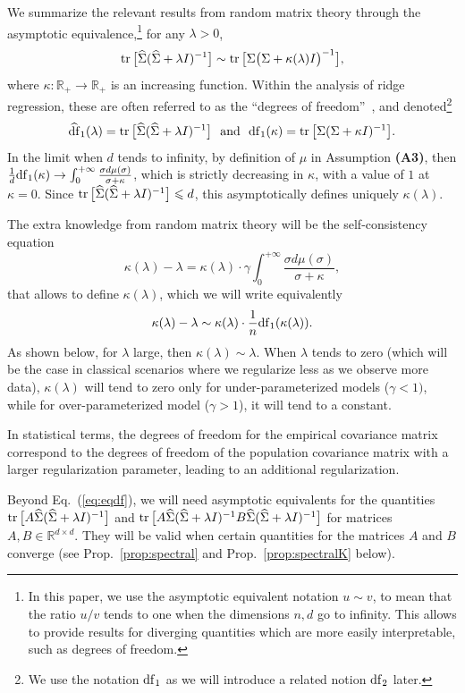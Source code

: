 \documentclass[11pt]{article}
\newcommand{\BEQ}{\begin{equation}}
\newcommand{\EEQ}{\end{equation}}
\newcommand{\tr}{\mathop{ \rm tr}}
\newcommand{\idm}{I}
\newcommand{\rb}{\mathbb{R}}
\newcommand{\eq}[1]{Eq.~(\ref{eq:#1})}
\def \hS{ \widehat{ \Sigma} }
\def \S{  { \Sigma} }
\begin{document}
We summarize the relevant results from random matrix theory through the asymptotic equivalence,\footnote{In this paper, we use the asymptotic equivalent notation $u \sim v$, to mean that the ratio $u/v$ tends to one when the dimensions $n,d$ go to infinity. This allows to provide results for diverging quantities which are more easily interpretable, such as degrees of freedom.} for any $\lambda > 0$,
\BEQ
\label{eq:eqdf} \tr \big[ \hS ( \hS+ \lambda \idm)^{-1}\big] \sim \tr \big[ \S \big( \S + \kappa(\lambda) \idm \big)^{-1} \big],
\EEQ
where $\kappa: \rb_+ \to \rb_+$ is an increasing function. Within the analysis of ridge regression, these are often referred to as the ``degrees of freedom''~\cite{FCM:Caponetto+Vito:2007,hastie_GAM}, and denoted\footnote{We use the notation $ {\rm df}_1$ as we will introduce a related notion $ {\rm df}_2$ later.}
$$
\widehat{\rm df}_1(\lambda) = \tr \big[ \hS ( \hS+ \lambda \idm)^{-1}\big]
\ \mbox{ and  }  \  {\rm df}_1(\kappa) = \tr \big[ \S ( \S+ \kappa \idm)^{-1}\big].
$$
In the limit when $d$ tends to infinity,  by definition of $\mu$ in Assumption \textbf{(A3)}, then $   \frac{1}{d} {\rm df}_1(\kappa) \to \int_0^{+\infty} \frac{ \sigma d\mu(\sigma)}{\sigma + \kappa}$, which is strictly decreasing in $\kappa$, with a value of $1$ at $\kappa=0$. Since $\tr \big[ \hS ( \hS+ \lambda \idm)^{-1}\big] \leqslant d$, this asymptotically defines uniquely $\kappa(\lambda)$.

The extra knowledge from random matrix theory will be the self-consistency equation 
$$
\kappa(\lambda) - \lambda  
= \kappa(\lambda) \cdot  \gamma \int_0^{+\infty} \frac{ \sigma d\mu(\sigma)}{\sigma + \kappa},$$
that allows to define $\kappa(\lambda)$,
which we will write equivalently
$$ \kappa(\lambda) - \lambda   \sim
\kappa(\lambda)  \cdot \frac{1}{n}  {\rm df}_1(\kappa(\lambda) ) .
$$
As shown below, for $\lambda$ large, then $\kappa(\lambda) \sim \lambda$. When $\lambda$ tends to zero (which will be the case in classical scenarios where we regularize less as we observe more data),  $\kappa(\lambda)$ will tend to zero only for under-parameterized models ($\gamma<1)$, while for over-parameterized model ($\gamma>1$), it will tend to a constant.

In statistical terms, the degrees of freedom for the empirical covariance matrix correspond to the degrees of freedom of the population covariance matrix with a larger regularization parameter, leading to an additional regularization.

Beyond \eq{eqdf}, we will need asymptotic equivalents for the   quantities
$\tr \big[ A  \hS ( \hS+ \lambda \idm)^{-1}  \big] $
and $
\tr \big[ A  \hS ( \hS+ \lambda \idm)^{-1}  B  \hS ( \hS+ \lambda \idm)^{-1}\big]  $ for matrices $A,B \in \rb^{d \times d}$.  They will be valid when certain quantities for the matrices $A$ and $B$ converge (see Prop.~\ref{prop:spectral} and Prop.~\ref{prop:spectralK} below).
\end{document}
